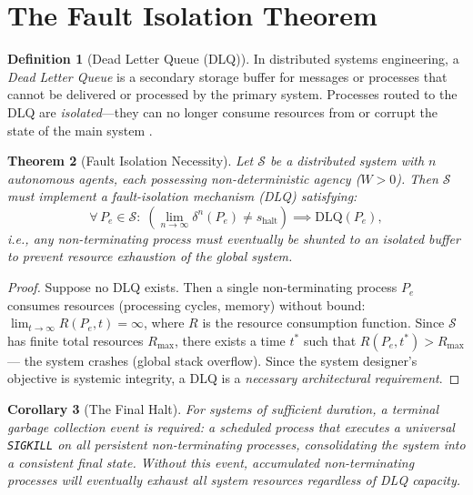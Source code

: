\documentclass[12pt, a4paper]{article}
\theoremstyle{plain}
\newtheorem{theorem}{Theorem}[section]
\newtheorem{corollary}[theorem]{Corollary}
\theoremstyle{definition}
\newtheorem{definition}[theorem]{Definition}
\theoremstyle{remark}
\newcommand{\calS}{\mathcal{S}}
\begin{document}
\section{The Fault Isolation Theorem}\label{sec:fault}

\begin{definition}[Dead Letter Queue (DLQ)]\label{def:dlq}
  In distributed systems engineering, a \emph{Dead Letter Queue} is a
  secondary storage buffer for messages or processes that cannot be
  delivered or processed by the primary system. Processes routed to the
  DLQ are \emph{isolated}---they can no longer consume resources from
  or corrupt the state of the main system \citep{Tanenbaum2014}.
\end{definition}

\begin{theorem}[Fault Isolation Necessity]\label{thm:fault}
  Let $\calS$ be a distributed system with $n$ autonomous agents, each
  possessing non-deterministic agency ($W > 0$). Then $\calS$ must
  implement a fault-isolation mechanism (DLQ) satisfying:
  \begin{equation}\label{eq:fault}
    \forall\, P_e \in \calS : \;
    \left(\lim_{n \to \infty} \delta^n(P_e) \neq s_{\text{halt}}\right)
    \implies \text{DLQ}(P_e),
  \end{equation}
  i.e., any non-terminating process must eventually be shunted to an
  isolated buffer to prevent resource exhaustion of the global system.
\end{theorem}

\begin{proof}
  Suppose no DLQ exists. Then a single non-terminating process $P_e$
  consumes resources (processing cycles, memory) without bound:
  $\lim_{t \to \infty} R(P_e, t) = \infty$, where $R$ is the resource
  consumption function. Since $\calS$ has finite total resources $R_{\max}$,
  there exists a time $t^*$ such that $R(P_e, t^*) > R_{\max}$ ---
  the system crashes (global stack overflow). Since the system designer's
  objective is systemic integrity, a DLQ is a \emph{necessary architectural
  requirement}. \qedhere
\end{proof}

\begin{corollary}[The Final Halt]\label{cor:gc}
  For systems of sufficient duration, a terminal \emph{garbage collection}
  event is required: a scheduled process that executes a universal
  \texttt{SIGKILL} on all persistent non-terminating processes,
  consolidating the system into a consistent final state. Without this
  event, accumulated non-terminating processes will eventually exhaust
  all system resources regardless of DLQ capacity.
\end{corollary}
\end{document}
